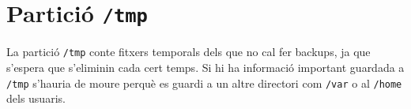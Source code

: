 
\section{Partició \texttt{/tmp}}%
\label{sec:part_tmp}

La partició \texttt{/tmp} conte fitxers temporals dels que no cal fer backups,
ja que s'espera que s'eliminin cada cert temps. Si hi ha informació important
guardada a \texttt{/tmp} s'hauria de moure perquè es guardi a un altre directori
com \texttt{/var} o al \texttt{/home} dels usuaris.
